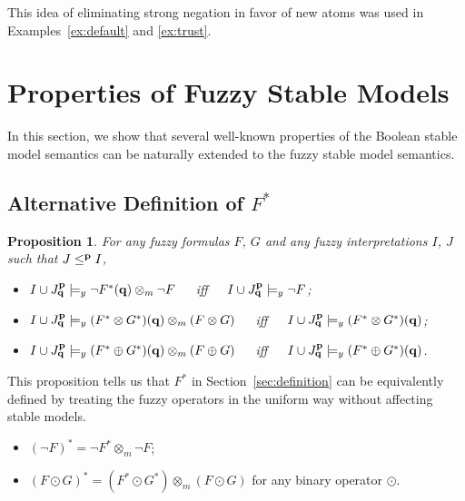 \documentclass[runningheads]{llncs}
\def\bi{\begin{itemize}}
\def\ei{\end{itemize}}
\def\fand{\otimes}
\def\for{\oplus}
\newtheorem{prop}{Proposition}
\begin{document}
This idea of eliminating strong negation in favor
of new atoms was used in Examples~\ref{ex:default} and \ref{ex:trust}.

\vspace{-0.3cm}

\section{Properties of Fuzzy Stable Models} \label{sec:properties} 

In this section, we show that several well-known properties of the Boolean stable model
semantics can be naturally extended to the fuzzy stable model
semantics. 

\subsection{Alternative Definition of $F^*$}


\begin{prop}\label{lem_star_negation}
For any fuzzy formulas $F$, $G$ and any fuzzy interpretations $I$, $J$ such that $J\le^{\bf p} I$, 
\bi
 \item  $I\cup J^{\bf p}_{\bf q}\models_y \neg F^*({\bf q})\fand_m
   \neg F$\ ~~iff~~\ $I\cup J^{\bf p}_{\bf q}\models_y \neg F$;
 \item  $I\cup J^{\bf p}_{\bf q}\models_y (F^*\fand G^*)({\bf q})\fand_m (F\fand
   G)$\ ~~iff~~\ $I\cup J^{\bf p}_{\bf q}\models_y (F^*\fand G^*)({\bf q})$;
 \item  $I\cup J^{\bf p}_{\bf q}\models_y (F^*\for G^*)({\bf q})\fand_m (F\for
   G)$\ ~~iff~~\ $I\cup J^{\bf p}_{\bf q}\models_y (F^*\for G^*)({\bf q})$.
\ei
\end{prop}

This proposition tells us that $F^*$ in Section~\ref{sec:definition}
can be equivalently defined by treating the fuzzy operators in the
uniform way without affecting stable models.

\bi
\item  $(\neg F)^* = \neg F^*\fand_m \neg F$;
\item  $(F\odot G)^* = (F^*\odot G^*)\fand_m (F\odot G)$ for any
  binary operator $\odot$.
\ei
\end{document}
